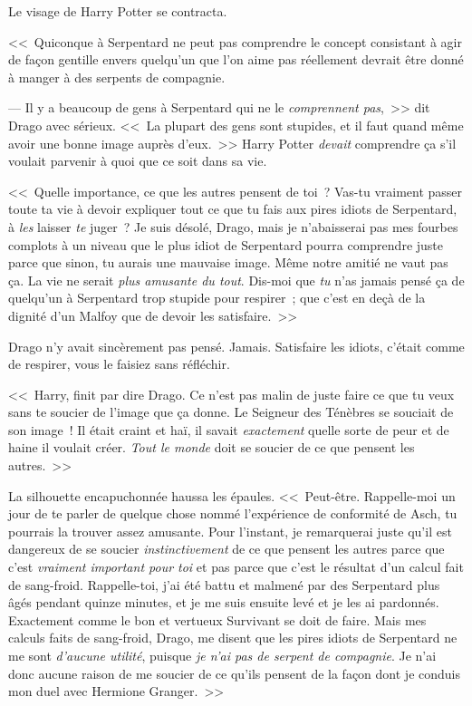Le visage de Harry Potter se contracta.

<<~Quiconque à Serpentard ne peut pas comprendre le concept consistant à agir de façon gentille envers quelqu'un que l'on aime pas réellement devrait être donné à manger à des serpents de compagnie.

--- Il y a beaucoup de gens à Serpentard qui ne le \emph{comprennent pas},~>> dit Drago avec sérieux. <<~La plupart des gens sont stupides, et il faut quand même avoir une bonne image auprès d'eux.~>> Harry Potter \emph{devait} comprendre ça s'il voulait parvenir à quoi que ce soit dans sa vie.

<<~Quelle importance, ce que les autres pensent de toi~? Vas-tu vraiment passer toute ta vie à devoir expliquer tout ce que tu fais aux pires idiots de Serpentard, à \emph{les} laisser \emph{te} juger~? Je suis désolé, Drago, mais je n'abaisserai pas mes fourbes complots à un niveau que le plus idiot de Serpentard pourra comprendre juste parce que sinon, tu aurais une mauvaise image. Même notre amitié ne vaut pas ça. La vie ne serait \emph{plus amusante du tout}. Dis-moi que \emph{tu} n'as jamais pensé ça de quelqu'un à Serpentard trop stupide pour respirer~; que c'est en deçà de la dignité d'un Malfoy que de devoir les satisfaire.~>>

Drago n'y avait sincèrement pas pensé. Jamais. Satisfaire les idiots, c'était comme de respirer, vous le faisiez sans réfléchir.

<<~Harry, finit par dire Drago. Ce n'est pas malin de juste faire ce que tu veux sans te soucier de l'image que ça donne. Le Seigneur des Ténèbres se souciait de son image~! Il était craint et haï, il savait \emph{exactement} quelle sorte de peur et de haine il voulait créer. \emph{Tout le monde} doit se soucier de ce que pensent les autres.~>>

La silhouette encapuchonnée haussa les épaules. <<~Peut-être. Rappelle-moi un jour de te parler de quelque chose nommé l'expérience de conformité de Asch, tu pourrais la trouver assez amusante. Pour l'instant, je remarquerai juste qu'il est dangereux de se soucier \emph{instinctivement} de ce que pensent les autres parce que c'est \emph{vraiment important pour toi} et pas parce que c'est le résultat d'un calcul fait de sang-froid. Rappelle-toi, j'ai été battu et malmené par des Serpentard plus âgés pendant quinze minutes, et je me suis ensuite levé et je les ai pardonnés. Exactement comme le bon et vertueux Survivant se doit de faire. Mais mes calculs faits de sang-froid, Drago, me disent que les pires idiots de Serpentard ne me sont \emph{d'aucune utilité}, puisque \emph{je n'ai pas de serpent de compagnie}. Je n'ai donc aucune raison de me soucier de ce qu'ils pensent de la façon dont je conduis mon duel avec Hermione Granger.~>>

